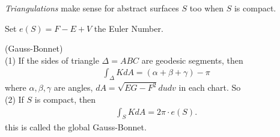 \documentclass[a4paper]{article}
\begin{document}
\emph{Triangulations} make sense for abstract surfaces $S$ too when $S$ is compact.

Set $e(S) = F-E+V$ the Euler Number.

\begin{thm} (Gauss-Bonnet)\\
(1) If the sides of triangle $\Delta = ABC$ are geodesic segments, then
\begin{equation*}
\begin{aligned}
\int_{\Delta} K dA = (\alpha+\beta+\gamma) - \pi
\end{aligned}
\end{equation*}
where $\alpha,\beta,\gamma$ are angles, $dA = \sqrt{EG-F^2} dudv$ in each chart. So\\
(2) If $S$ is compact, then
\begin{equation*}
\begin{aligned}
\int_S K dA = 2\pi \cdot e(S).
\end{aligned}
\end{equation*}
this is called the global Gauss-Bonnet.
\end{thm}
\end{document}
